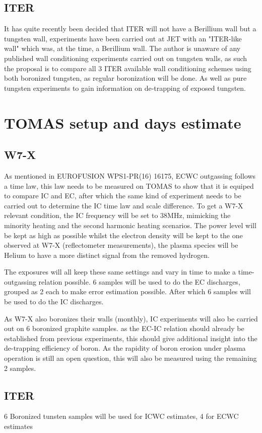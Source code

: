 \documentclass{article}
\begin{document}
\subsection*{ITER}
It has quite recently been decided that ITER will not have a Berillium wall but a tungsten wall, 
experiments have been carried out at JET with an "ITER-like wall"\cite{DOUAI2013S1172} which
was, at the time, a Berillium wall. The author is unaware of any published wall conditioning experiments carried out 
on tungsten walls, as such the proposal is to compare all 3 ITER available wall conditioning schemes using both
boronized tungsten, as regular boronization will be done. As well as pure tungsten experiments
to gain information on de-trapping of exposed tungsten.
\section{TOMAS setup and days estimate}
\subsection{W7-X}
As mentioned in EUROFUSION WPS1-PR(16) 16175, ECWC outgassing follows a time law, this law 
needs to be measured on TOMAS to show that it is equiped to compare IC and EC, after which
the same kind of experiment needs to be carried out to determine the IC time law and scale difference.
To get a W7-X relevant condition, the IC frequency will be set to 38MHz, mimicking the minority heating
and the second harmonic heating scenarios. The power level will be kept as high as possible whilst the electron density
will be kept to the one observed at W7-X (reflectometer measurements), the plasma species will be Helium to have
a more distinct signal from the removed hydrogen.

The exposures will all keep these same settings and vary in time to make a time-outgassing relation possible.
6 samples will be used to do the EC discharges, grouped as 2 each to make error estimation possible. After which
6 samples will be used to do the IC discharges. 

As W7-X also boronizes their walls (monthly), IC experiments
will also be carried out on 6 boronized graphite samples. as
the EC-IC relation should already be established from previous
experiments, this should give additional insight into the
de-trapping efficiency of boron.
As the rapidity of boron erosion under plasma operation is
still an open question, this will also be measured using the
remaining 2 samples.
\subsection{ITER}
6 Boronized tunsten samples will be used for ICWC estimates,
4 for ECWC estimates 
\end{document}
